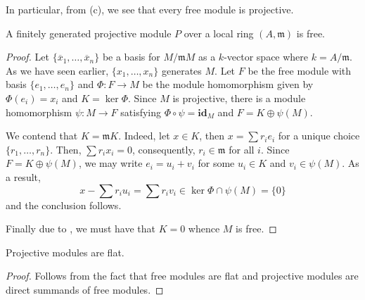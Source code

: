 In particular, from (c), we see that every free module is projective.

\begin{lemma}
    A finitely generated projective module $P$ over a local ring $(A,\mathfrak m)$ is free.
\end{lemma}
\begin{proof}
    Let $\{\overline x_1,\ldots,\overline x_n\}$ be a basis for $M/\mathfrak mM$ as a $k$-vector space where $k = A/\mathfrak m$. As we have seen earlier, $\{x_1,\ldots,x_n\}$ generates $M$. Let $F$ be the free module with basis $\{e_1,\ldots,e_n\}$ and $\Phi: F\to M$ be the module homomorphism given by $\Phi(e_i) = x_i$ and $K = \ker\Phi$. Since $M$ is projective, there is a module homomorphism $\psi: M\to F$ satisfying $\Phi\circ\psi = \mathbf{id}_M$ and $F = K\oplus\psi(M)$.

    We contend that $K = \mathfrak mK$. Indeed, let $x\in K$, then $x = \sum r_ie_i$ for a unique choice $\{r_1,\ldots,r_n\}$. Then, $\sum r_ix_i = 0$, consequently, $r_i\in\mathfrak m$ for all $i$. Since $F = K\oplus\psi(M)$, we may write $e_i = u_i + v_i$ for some $u_i\in K$ and $v_i\in\psi(M)$. As a result, 
    \begin{equation*}
        x - \sum r_iu_i = \sum r_iv_i\in\ker\Phi\cap\psi(M) = \{0\}
    \end{equation*}
    and the conclusion follows.

    Finally due to , we must have that $K = 0$ whence $M$ is free.
\end{proof}

\begin{proposition}
    Projective modules are flat.
\end{proposition}
\begin{proof}
    Follows from the fact that free modules are flat and projective modules are direct summands of free modules.
\end{proof}